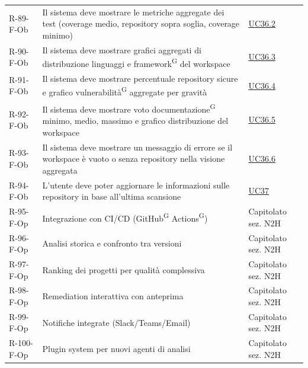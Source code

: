 \documentclass[a4paper, 11pt]{article}
\begin{document}
\begin{longtable}[c]{ >{\centering\arraybackslash}m{2.5cm} >{\centering\arraybackslash}m{8.3cm} >{\centering\arraybackslash}m{3.5cm} }
    R-89-F-Ob & Il sistema deve mostrare le metriche aggregate dei test (coverage medio, repository sopra soglia, coverage minimo) & \hyperref[UC36.2]{UC36.2} \\
    R-90-F-Ob & Il sistema deve mostrare grafici aggregati di distribuzione linguaggi e framework\textsuperscript{G} del workspace & \hyperref[UC36.3]{UC36.3} \\
    R-91-F-Ob & Il sistema deve mostrare percentuale repository sicure e grafico vulnerabilità\textsuperscript{G} aggregate per gravità & \hyperref[UC36.4]{UC36.4} \\
    R-92-F-Ob & Il sistema deve mostrare voto documentazione\textsuperscript{G} minimo, medio, massimo e grafico distribuzione del workspace & \hyperref[UC36.5]{UC36.5} \\
    R-93-F-Ob & Il sistema deve mostrare un messaggio di errore se il workspace è vuoto o senza repository nella visione aggregata & \hyperref[UC36.6]{UC36.6} \\
    R-94-F-Ob & L'utente deve poter aggiornare le informazioni sulle repository in base all'ultima scansione & \hyperref[UC37]{UC37} \\
    R-95-F-Op & Integrazione con CI/CD (GitHub\textsuperscript{G} Actions\textsuperscript{G}) & Capitolato sez. N2H \\
    R-96-F-Op & Analisi storica e confronto tra versioni & Capitolato sez. N2H \\
    R-97-F-Op & Ranking dei progetti per qualità complessiva & Capitolato sez. N2H \\
    R-98-F-Op & Remediation interattiva con anteprima & Capitolato sez. N2H \\
    R-99-F-Op & Notifiche integrate (Slack/Teams/Email) & Capitolato sez. N2H \\
    R-100-F-Op & Plugin system per nuovi agenti di analisi & Capitolato sez. N2H \\
\end{longtable}
\end{document}
